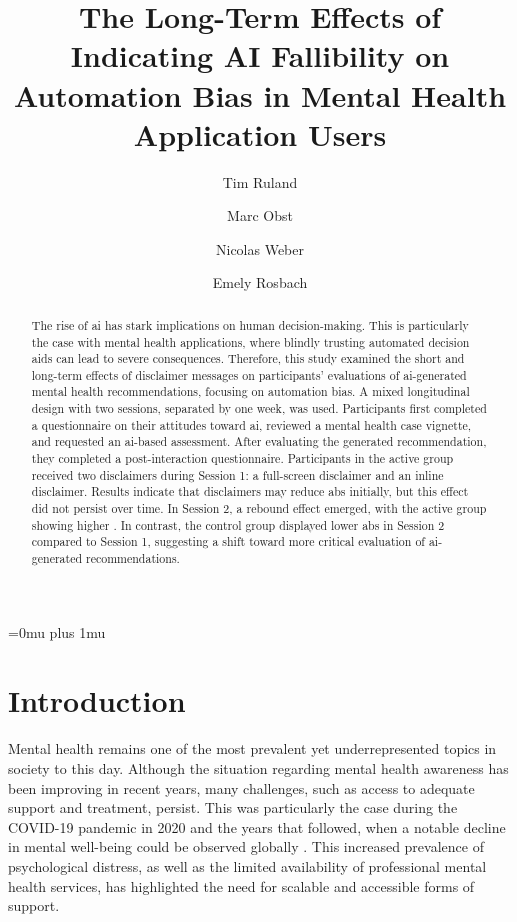 \documentclass[sigconf,natbib=false]{acmart}
\title[AI Fallibility and Automation Bias long-term Effects]{The Long-Term Effects of Indicating AI Fallibility on Automation Bias in Mental Health Application Users}
\author{Tim Ruland}
\affiliation{
  \institution{Technische Hochschule Ingolstadt}
  \city{Ingolstadt}
  \country{Germany}}
\author{Marc Obst}
\affiliation{
  \institution{Technische Hochschule Ingolstadt}
  \city{Ingolstadt}
  \country{Germany}}
\author{Nicolas Weber}
\affiliation{
  \institution{Technische Hochschule Ingolstadt}
  \city{Ingolstadt}
  \country{Germany}}
\author{Emely Rosbach}
\affiliation{
  \institution{Technische Hochschule Ingolstadt}
  \city{Ingolstadt}
  \country{Germany}}
\begin{document}
\hypersetup{
    hidelinks,
    breaklinks=true
}


\Urlmuskip=0mu plus 1mu\relax

\begin{abstract}
The rise of \acrfull{ai} has stark implications on human decision-making.
This is particularly the case with mental health applications, where blindly trusting automated decision aids can lead to severe consequences.
Therefore, this study examined the short and long-term effects of disclaimer messages on participants’ evaluations of \acrshort{ai}-generated mental health recommendations, focusing on automation bias.
A mixed longitudinal design with two sessions, separated by one week, was used.
Participants first completed a questionnaire on their attitudes toward \acrshort{ai}, reviewed a mental health case vignette, and requested an \acrshort{ai}-based assessment. After evaluating the generated recommendation, they completed a post-interaction questionnaire.
Participants in the active group received two disclaimers during Session 1: a full-screen disclaimer and an inline disclaimer.
Results indicate that disclaimers may reduce \acrfull{abs} initially, but this effect did not persist over time. In Session 2, a rebound effect emerged, with the active group showing higher .
In contrast, the control group displayed lower \acrshort{abs} in Session 2 compared to Session 1, suggesting a shift toward more critical evaluation of \acrshort{ai}-generated recommendations.
\end{abstract}




\maketitle


\section{Introduction}

Mental health remains one of the most prevalent yet underrepresented topics in society to this day. Although the situation regarding mental health awareness has been improving in recent years, many challenges, such as access to adequate support and treatment, persist. This was particularly the case during the COVID-19 pandemic in 2020 and the years that followed, when a notable decline in mental well-being could be observed globally \autocite[]{robert_koch_public_health_reporting}. This increased prevalence of psychological distress, as well as the limited availability of professional mental health services, has highlighted the need for scalable and accessible forms of support.
\end{document}
